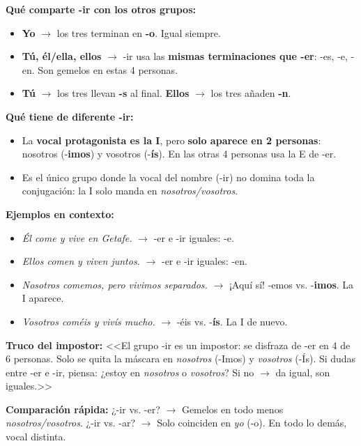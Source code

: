 \documentclass[a4paper,10pt]{article}
\begin{document}
\vspace{4pt}
\small

\textbf{Qué comparte -ir con los otros grupos:}
\begin{itemize}[nosep, leftmargin=1.2em]
\item \textbf{Yo} $\to$ los tres terminan en \textbf{-o}. Igual siempre.
\item \textbf{Tú, él/ella, ellos} $\to$ -ir usa las \textbf{mismas terminaciones que -er}: -es, -e, -en. Son gemelos en estas 4 personas.
\item \textbf{Tú} $\to$ los tres llevan \textbf{-s} al final. \textbf{Ellos} $\to$ los tres añaden \textbf{-n}.
\end{itemize}

\textbf{Qué tiene de diferente -ir:}
\begin{itemize}[nosep, leftmargin=1.2em]
\item La \textbf{vocal protagonista es la I}, pero \textbf{solo aparece en 2 personas}: nosotros (-\textbf{imos}) y vosotros (-\textbf{ís}). En las otras 4 personas usa la E de -er.
\item Es el único grupo donde la vocal del nombre (-ir) no domina toda la conjugación: la I solo manda en \textit{nosotros/vosotros}.
\end{itemize}

\textbf{Ejemplos en contexto:}
\begin{itemize}[nosep, leftmargin=1.2em]
\item \textit{Él come y vive en Getafe.} $\to$ -er e -ir iguales: -e.
\item \textit{Ellos comen y viven juntos.} $\to$ -er e -ir iguales: -en.
\item \textit{Nosotros comemos, pero vivimos separados.} $\to$ ¡Aquí sí! -emos vs. -\textbf{imos}. La I aparece.
\item \textit{Vosotros coméis y vivís mucho.} $\to$ -éis vs. -\textbf{ís}. La I de nuevo.
\end{itemize}

\begin{trucoconjugacion}
\textbf{Truco del impostor:} <<El grupo -ir es un impostor: se disfraza de -er en 4 de 6 personas. Solo se quita la máscara en \textit{nosotros} (-Imos) y \textit{vosotros} (-Ís). Si dudas entre -er e -ir, piensa: ¿estoy en \textit{nosotros} o \textit{vosotros}? Si no $\to$ da igual, son iguales.>>
\end{trucoconjugacion}

\begin{tcolorbox}[colback=tealconj!5, colframe=tealconj!40, boxrule=0.5pt, left=4pt, right=4pt, top=3pt, bottom=3pt]
\textbf{Comparación rápida:} ¿-ir vs. -er? $\to$ Gemelos en todo menos \textit{nosotros/vosotros}. ¿-ir vs. -ar? $\to$ Solo coinciden en \textit{yo} (-o). En todo lo demás, vocal distinta.
\end{tcolorbox}
\end{document}
